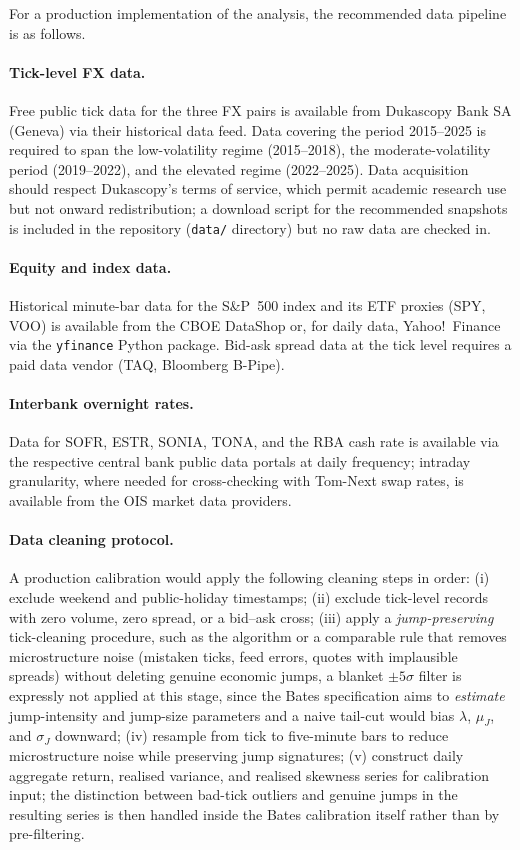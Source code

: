 \documentclass[preprint,12pt,authoryear]{elsarticle}
\theoremstyle{definition}
\begin{document}
For a production implementation of the analysis, the
recommended data pipeline is as follows.

\paragraph{Tick-level FX data.} Free public tick data for the
three FX pairs is available from Dukascopy Bank SA (Geneva) via
their historical data feed. Data covering the period 2015--2025
is required to span the low-volatility regime (2015--2018),
the moderate-volatility period (2019--2022), and the elevated
regime (2022--2025). Data acquisition should respect Dukascopy's
terms of service, which permit academic research use but not
onward redistribution; a download script for the recommended
snapshots is included in the repository (\texttt{data/}
directory) but no raw data are checked in.

\paragraph{Equity and index data.} Historical minute-bar data
for the S\&P~500 index and its ETF proxies (SPY, VOO) is
available from the CBOE DataShop or, for daily data,
Yahoo!~Finance via the \texttt{yfinance} Python package. Bid-ask
spread data at the tick level requires a paid data vendor
(TAQ, Bloomberg B-Pipe).

\paragraph{Interbank overnight rates.} Data for SOFR, ESTR,
SONIA, TONA, and the RBA cash rate is available via the
respective central bank public data portals at daily frequency;
intraday granularity, where needed for cross-checking with
Tom-Next swap rates, is available from the OIS market data
providers.

\paragraph{Data cleaning protocol.} A production calibration
would apply the following cleaning steps in order:
(i) exclude weekend and public-holiday timestamps;
(ii) exclude tick-level records with zero volume, zero spread,
or a bid--ask cross;
(iii) apply a \emph{jump-preserving} tick-cleaning procedure,
such as the \citet{BrownleesGallo2006} algorithm or a
comparable rule that removes microstructure noise (mistaken
ticks, feed errors, quotes with implausible spreads) without
deleting genuine economic jumps, a blanket $\pm 5\sigma$
filter is expressly not applied at this stage, since the
Bates specification aims to \emph{estimate} jump-intensity and
jump-size parameters and a naive tail-cut would bias
$\lambda$, $\mu_J$, and $\sigma_J$ downward;
(iv) resample from tick to five-minute bars to reduce
microstructure noise while preserving jump signatures;
(v) construct daily aggregate return, realised variance, and
realised skewness series for calibration input; the
distinction between bad-tick outliers and genuine jumps in the
resulting series is then handled inside the Bates calibration
itself rather than by pre-filtering.
\end{document}

